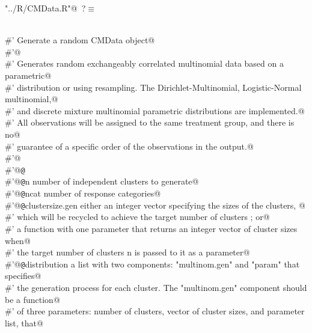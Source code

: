 \documentclass[reqno]{amsart}
\renewcommand{\NWtarget}[2]{\hypertarget{#1}{#2}}
\begin{document}
\begin{flushleft} \small\label{scrap8}\raggedright\small
\NWtarget{nuweb?}{} \verb@"../R/CMData.R"@\nobreak\ {\footnotesize {?}}$\equiv$
\vspace{-1ex}
\begin{list}{}{} \item
\mbox{}\verb@@\\
\mbox{}\verb@#' Generate a random CMData object@\\
\mbox{}\verb@#'@\\
\mbox{}\verb@#' Generates random exchangeably correlated multinomial data based on a parametric@\\
\mbox{}\verb@#' distribution or using resampling. The Dirichlet-Multinomial, Logistic-Normal multinomial,@\\
\mbox{}\verb@#' and discrete mixture multinomial parametric distributions are implemented.@\\
\mbox{}\verb@#' All observations will be assigned to the same treatment group, and there is no@\\
\mbox{}\verb@#' guarantee of a specific order of the observations in the output.@\\
\mbox{}\verb@#'@\\
\mbox{}\verb@#'@{\tt @}\verb@export@\\
\mbox{}\verb@#'@{\tt @}\verb@param n number of independent clusters to generate@\\
\mbox{}\verb@#'@{\tt @}\verb@param ncat number of response categories@\\
\mbox{}\verb@#'@{\tt @}\verb@param clustersize.gen either an integer vector specifying the sizes of the clusters, @\\
\mbox{}\verb@#' which will be recycled to achieve the target number of clusters ; or@\\
\mbox{}\verb@#' a function with one parameter that returns an integer vector of cluster sizes when@\\
\mbox{}\verb@#' the target number of clusters n is passed to it as a parameter@\\
\mbox{}\verb@#'@{\tt @}\verb@param distribution a list with two components: "multinom.gen" and "param" that specifies@\\
\mbox{}\verb@#' the generation process for each cluster. The "multinom.gen" component should be a function@\\
\mbox{}\verb@#' of three parameters: number of clusters, vector of cluster sizes, and parameter list, that@\\

\end{list}
\end{flushleft}
\end{document}

